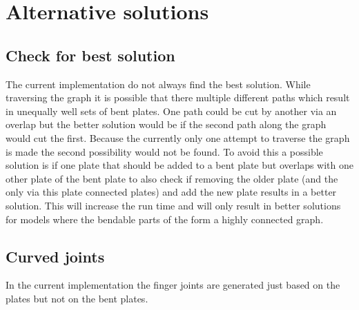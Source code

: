 \documentclass[../ClassicThesis.tex]{subfiles}
\begin{document}
\section{Alternative solutions}

\subsection{Check for best solution}

The current implementation do not always find the best solution. While traversing the graph it is possible that there multiple different paths which result in unequally well sets of bent plates. One path could be cut by another via an overlap but the better solution would be if the second path along the graph would cut the first. Because the currently only one attempt to traverse the graph is made the second possibility would not be found.
To avoid this a possible solution is if one plate that should be added to a bent plate but overlaps with one other plate of the bent plate to also check if removing the older plate (and the only via this plate connected plates) and add the new plate results in a better solution.
This will increase the run time and will only result in better solutions for models where the bendable parts of the \threedmodel form a highly connected graph.

\subsection{Curved joints}

In the current implementation the finger joints are generated just based on the plates but not on the bent plates. 
\end{document}
